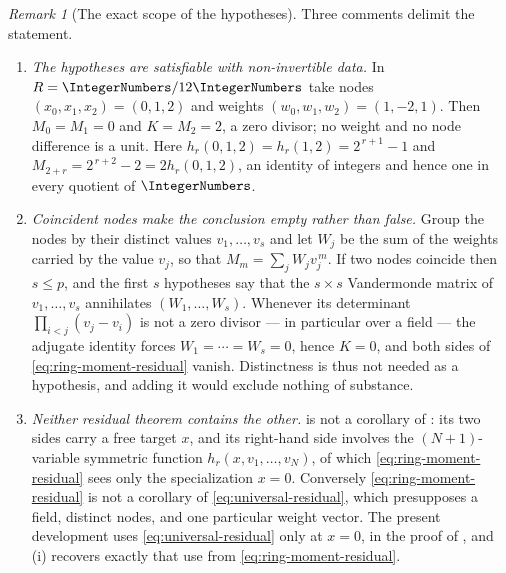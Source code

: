 \documentclass[11pt,a4paper,oneside,openany]{book}
\theoremstyle{definition}
\theoremstyle{remark}
\newtheorem{remark}[remark]{Remark}
\begin{document}
\begin{remark}[The exact scope of the hypotheses]\label{rem:ring-residual-scope}
Three comments delimit the statement.
\begin{enumerate}[label=\textup{(\roman*)}]
\item \emph{The hypotheses are satisfiable with non-invertible data.}  In
 $R=\IntegerNumbers/12\IntegerNumbers$ take nodes $(x_0,x_1,x_2)=(0,1,2)$ and weights
 $(w_0,w_1,w_2)=(1,-2,1)$.  Then $M_0=M_1=0$ and $K=M_2=2$, a zero divisor; no
 weight and no node difference is a unit.  Here
 $h_r(0,1,2)=h_r(1,2)=2^{\,r+1}-1$ and
 $M_{2+r}=2^{\,r+2}-2=2h_r(0,1,2)$, an identity of integers and hence one in
 every quotient of $\IntegerNumbers$.
\item \emph{Coincident nodes make the conclusion empty rather than false.}
 Group the nodes by their distinct values $v_1,\ldots,v_s$ and let $W_j$ be the
 sum of the weights carried by the value $v_j$, so that $M_m=\sum_jW_jv_j^{\,m}$.
 If two nodes coincide then $s\le p$, and the first $s$ hypotheses say that the
 $s\times s$ Vandermonde matrix of $v_1,\ldots,v_s$ annihilates
 $(W_1,\ldots,W_s)$.  Whenever its determinant $\prod_{i<j}(v_j-v_i)$ is not a
 zero divisor --- in particular over a field --- the adjugate identity forces
 $W_1=\cdots=W_s=0$, hence $K=0$, and both sides of
 \eqref{eq:ring-moment-residual} vanish.  Distinctness is thus not needed as a
 hypothesis, and adding it would exclude nothing of substance.
\item \emph{Neither residual theorem contains the other.}
  is not a corollary of
 : its two sides carry a free target $x$, and its
 right-hand side involves the $(N+1)$-variable symmetric function
 $h_r(x,v_1,\ldots,v_N)$, of which \eqref{eq:ring-moment-residual} sees only the
 specialization $x=0$.  Conversely \eqref{eq:ring-moment-residual} is not a
 corollary of \eqref{eq:universal-residual}, which presupposes a field, distinct
 nodes, and one particular weight vector.  The present development uses
 \eqref{eq:universal-residual} only at $x=0$, in the proof of
 , and
 \,(i) recovers exactly that use from
 \eqref{eq:ring-moment-residual}.
\end{enumerate}
\end{remark}
\end{document}
